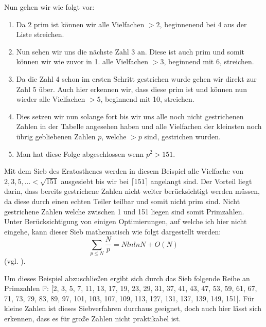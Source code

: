 \documentclass[12pt,a4paper]{article}
\theoremstyle{definition}
\begin{document}
Nun gehen wir wie folgt vor:
\begin{enumerate}
    \item Da 2 prim ist können wir alle Vielfachen $>2$, beginnenend bei 4 aus der Liste streichen.
    \item Nun sehen wir uns die nächste Zahl 3 an.
    Diese ist auch prim und somit können wir wie zuvor in 1. alle Vielfachen $>3$, beginnend mit 6, streichen.
    \item Da die Zahl 4 schon im ersten Schritt gestrichen wurde gehen wir direkt zur Zahl 5 über.
    Auch hier erkennen wir, dass diese prim ist und können nun wieder alle Vielfachen $>5$, beginnend mit 10, streichen.
    \item Dies setzen wir nun solange fort bis wir uns alle noch nicht gestrichenen Zahlen in der Tabelle angesehen haben und alle Vielfachen der kleinsten noch übrig gebliebenen Zahlen $p$, welche $>p$ sind, gestrichen wurden.
    \item Man hat diese Folge abgeschlossen wenn $p^2 > 151$. 
\end{enumerate}
Mit dem Sieb des Eratosthenes werden in diesem Beispiel alle Vielfache von $2, 3, 5, ... < \sqrt{151}$ ausgesiebt bis wir bei $\lceil151\rceil$ angelangt sind.
Der Vorteil liegt darin, dass bereits gestrichene Zahlen nicht weiter berücksichtigt werden müssen, da diese durch einen echten Teiler teilbar und somit nicht prim sind.
Nicht gestrichene Zahlen welche zwischen 1 und 151 liegen sind somit Primzahlen.
Unter Berücksichtigung von einigen Optimierungen, auf welche ich hier nicht eingehe, kann dieser Sieb mathematisch wie folgt dargestellt werden:
\[\sum_{p\le N} \frac{N}p = N ln ln N + O(N)\]
(vgl. \cite[121]{Crandall2005}).

Um dieses Beispiel abzuschließen ergibt sich durch das Sieb folgende Reihe an Primzahlen $\mathbb{P}$: [2, 3, 5, 7, 11, 13, 17, 19, 23, 29, 31, 37, 41, 43, 47, 53, 59, 61, 67, 71, 73, 79, 83, 89, 97, 101, 103, 107, 109, 113, 127, 131, 137, 139, 149, 151]. \newline
Für kleine Zahlen ist dieses Siebverfahren durchaus geeignet, doch auch hier lässt sich erkennen, dass es für große Zahlen nicht praktikabel ist.
\end{document}
